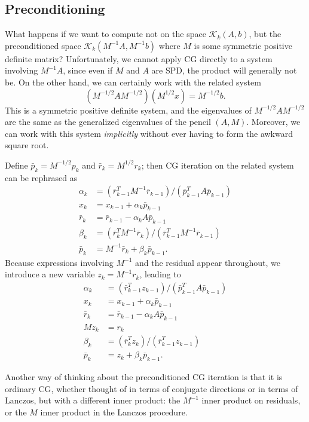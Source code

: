 \documentclass[12pt, leqno]{article} %
\begin{document}
\subsection{Preconditioning}

What happens if we want to compute not on the space $\mathcal{K}_k(A,b)$,
but the preconditioned space $\mathcal{K}_k(M^{-1} A, M^{-1} b)$
where $M$ is some symmetric positive definite matrix?  Unfortunately,
we cannot apply CG directly to a system involving $M^{-1} A$, since
even if $M$ and $A$ are SPD, the product will generally not be.
On the other hand, we can certainly work with the related system
\[
  (M^{-1/2} A M^{-1/2}) (M^{1/2} x) = M^{-1/2} b.
\]
This is a symmetric positive definite system, and the eigenvalues
of $M^{-1/2} A M^{-1/2}$ are the same as the generalized eigenvalues
of the pencil $(A,M)$.  Moreover, we can work with this system
{\em implicitly} without ever having to form the awkward square
root.

Define $\bar{p}_k = M^{-1/2} p_k$ and $\bar{r}_k = M^{1/2} r_k$;
then CG iteration on the related system can be rephrased as
\begin{align*}
  \alpha_k &= (\bar{r}_{k-1}^T M^{-1} \bar{r}_{k-1})/(\bar{p}_{k-1}^T A \bar{p}_{k-1}) \\
  x_{k} &= x_{k-1} + \alpha_k \bar{p}_{k-1} \\
  \bar{r}_{k} &= \bar{r}_{k-1} - \alpha_k A \bar{p}_{k-1} \\
  \beta_{k} &= (\bar{r}_k^T M^{-1} \bar{r}_k)/(\bar{r}_{k-1}^T M^{-1} \bar{r}_{k-1}) \\
  \bar{p}_k &= M^{-1} \bar{r}_{k} + \beta_k \bar{p}_{k-1}.
\end{align*}
Because expressions involving $M^{-1}$ and the residual appear throughout,
we introduce a new variable $z_k = M^{-1} r_k$, leading to
\begin{align*}
  \alpha_k &= (\bar{r}_{k-1}^T z_{k-1})/(\bar{p}_{k-1}^T A \bar{p}_{k-1}) \\
  x_{k} &= x_{k-1} + \alpha_k \bar{p}_{k-1} \\
  \bar{r}_{k} &= \bar{r}_{k-1} - \alpha_k A \bar{p}_{k-1} \\
  M z_{k} &= r_k \\
  \beta_{k} &= (\bar{r}_k^T z_k)/(\bar{r}_{k-1}^T z_{k-1}) \\
  \bar{p}_k &= z_{k} + \beta_k \bar{p}_{k-1}.
\end{align*}

Another way of thinking about the preconditioned CG iteration is
that it is ordinary CG, whether thought of in terms of conjugate
directions or in terms of Lanczos, but with a different inner
product: the $M^{-1}$ inner product on residuals, or the $M$ inner
product in the Lanczos procedure.
\end{document}
